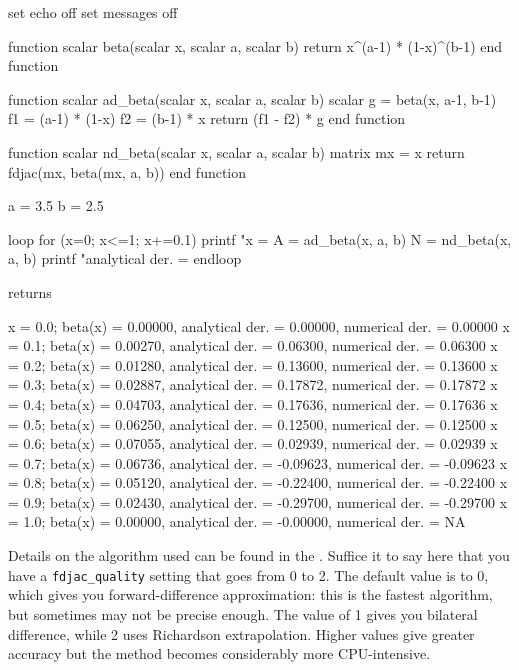 \begin{code}
set echo off
set messages off

function scalar beta(scalar x, scalar a, scalar b)
    return x^(a-1) * (1-x)^(b-1)
end function

function scalar ad_beta(scalar x, scalar a, scalar b)
    scalar g = beta(x, a-1, b-1)
    f1 = (a-1) * (1-x)
    f2 = (b-1) * x
    return (f1 - f2) * g
end function

function scalar nd_beta(scalar x, scalar a, scalar b)
    matrix mx = {x}
    return fdjac(mx, beta(mx, a, b))
end function

a = 3.5
b = 2.5

loop for (x=0; x<=1; x+=0.1)
    printf "x = %
    A = ad_beta(x, a, b)
    N = nd_beta(x, a, b)
    printf "analytical der. = %
endloop
\end{code}

returns 

\begin{code}
x = 0.0; beta(x) = 0.00000, analytical der. =  0.00000, numerical der. =  0.00000
x = 0.1; beta(x) = 0.00270, analytical der. =  0.06300, numerical der. =  0.06300
x = 0.2; beta(x) = 0.01280, analytical der. =  0.13600, numerical der. =  0.13600
x = 0.3; beta(x) = 0.02887, analytical der. =  0.17872, numerical der. =  0.17872
x = 0.4; beta(x) = 0.04703, analytical der. =  0.17636, numerical der. =  0.17636
x = 0.5; beta(x) = 0.06250, analytical der. =  0.12500, numerical der. =  0.12500
x = 0.6; beta(x) = 0.07055, analytical der. =  0.02939, numerical der. =  0.02939
x = 0.7; beta(x) = 0.06736, analytical der. = -0.09623, numerical der. = -0.09623
x = 0.8; beta(x) = 0.05120, analytical der. = -0.22400, numerical der. = -0.22400
x = 0.9; beta(x) = 0.02430, analytical der. = -0.29700, numerical der. = -0.29700
x = 1.0; beta(x) = 0.00000, analytical der. = -0.00000, numerical der. =       NA
\end{code}

Details on the algorithm used can be found in the \GCR. Suffice it to
say here that you have a \texttt{fdjac\_quality} setting that goes
from 0 to 2. The default value is to 0, which gives you
forward-difference approximation: this is the fastest algorithm, but
sometimes may not be precise enough. The value of 1 gives you
bilateral difference, while 2 uses Richardson extrapolation. Higher
values give greater accuracy but the method becomes considerably more
CPU-intensive.




